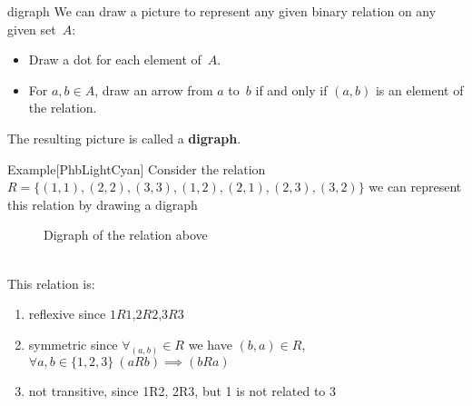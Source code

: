\documentclass[../MATH-2000-Notes.tex]{subfiles}
\begin{document}
\begin{Definition}
    {digraph}
    We can draw a picture to represent any given binary relation on any given set~$A$:
    \begin{itemize}
        \item Draw a dot for each element of~$A$.
        \item For $a,b \in A$, draw an arrow from $a$ to~$b$ if and only if $(a,b)$ is an element of the relation.
    \end{itemize}
    The resulting picture is called a \textbf{digraph}.
\end{Definition}
\begin{commentbox}{Example}[{PhbLightCyan}]
    Consider the relation \(R = \{(1,1),(2,2),(3,3),(1,2),(2,1),(2,3),(3,2)\}\) we can represent this relation by drawing a digraph
\end{commentbox}
\begin{figure}[htbp]
    \centering


    \caption{Digraph of the relation above}
    \label{fig:digraph}
\end{figure}
\\
This relation is:
\begin{enumerate}
    \item reflexive since \(1R1\),\(2R2\),\(3R3\)
    \item symmetric since \(\forall_{(a,b)}\in R\) we have \((b,a)\in R\), \(\forall a,b \in \{1,2,3\}\ (aRb)\implies (bRa)\)
    \item not transitive, since 1R2, 2R3, but 1 is not related to 3
\end{enumerate}
\end{document}
